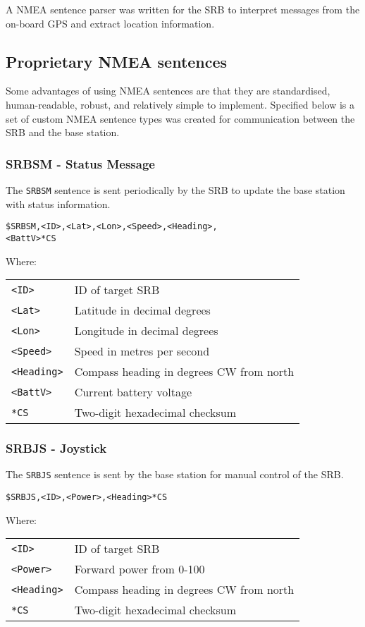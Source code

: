 \documentclass[a4paper]{IEEEtran}
\newenvironment{nmeaspec}[1]
{
\newcommand{\field}[2]{\texttt{##1} & ##2 \\}
\vspace{0.2cm}
\noindent\texttt{#1}
\vspace{0.2cm}

\noindent Where: \vspace{0.1cm}\\  \noindent
\vspace{0.2cm}
\begin{tabular}{ll}
}
{
\end{tabular}
}
\begin{document}
A NMEA sentence parser was written for the SRB to interpret messages from the on-board GPS and extract location information.

\subsection{Proprietary NMEA sentences}
Some advantages of using NMEA sentences are that they are standardised, human-readable, robust, and relatively simple to implement. Specified below is a set of custom NMEA sentence types was created for communication between the SRB and the base station.

\subsubsection{SRBSM - Status Message}
The \texttt{SRBSM} sentence is sent periodically by the SRB to update the base station with status information.

\begin{nmeaspec}{\$SRBSM,<ID>,<Lat>,<Lon>,<Speed>,<Heading>,\\<BattV>*CS}
\field{<ID>}{ID of target SRB}
\field{<Lat>}{Latitude in decimal degrees}
\field{<Lon>}{Longitude in decimal degrees}
\field{<Speed>}{Speed in metres per second}
\field{<Heading>}{Compass heading in degrees CW from north}
\field{<BattV>}{Current battery voltage}
\field{*CS}{Two-digit hexadecimal checksum}
\end{nmeaspec}

\subsubsection{SRBJS - Joystick}
The \texttt{SRBJS} sentence is sent by the base station for manual control of the SRB.

\begin{nmeaspec}{\$SRBJS,<ID>,<Power>,<Heading>*CS}
\field{<ID>}{ID of target SRB}
\field{<Power>}{Forward power from 0-100}
\field{<Heading>}{Compass heading in degrees CW from north}
\field{*CS}{Two-digit hexadecimal checksum}
\end{nmeaspec}



\end{document}
